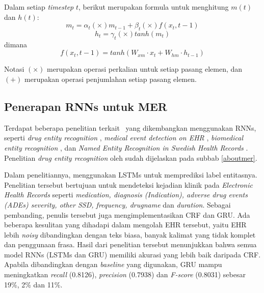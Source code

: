 Dalam setiap \textit{timestep} $ t $, berikut merupakan formula untuk menghitung $ m(t) $ dan $ h(t) $:
\begin{equation}\label{eq:mt}
m_{t}=\alpha_{t} (\times) m_{t-1} + \beta_{t} (\times) f(x_{t},{t-1})
\end{equation}
\begin{equation}\label{eq:ht}
h_{t}=\gamma_{t} (\times) tanh(m_{t})
\end{equation}
dimana
\begin{equation}\label{eq:hf}
f(x_{t},{t-1})=tanh(W_{xm} \cdot x_{t} + W_{hm} \cdot h_{t-1})
\end{equation}

Notasi $ (\times) $ merupakan operasi perkalian untuk setiap pasang elemen, dan $ (+) $ merupakan operasi penjumlahan setiap pasang elemen.

\subsection{Penerapan RNNs untuk MER}
Terdapat beberapa penelitian terkait \mer~yang dikembangkan menggunakan RNNs, seperti \textit{drug entity recognition} \citep{mujiono2016new}, \textit{medical event detection on EHR} \citep{jagannatha2016bidirectional}, \textit{biomedical entity recognition} \citep{limsopatham2016learning}, dan \textit{Named Entity Recognition in Swedish Health Records} \citep{almgren2016named}. Penelitian \textit{drug entity recognition} oleh \cite{mujiono2016new} sudah dijelaskan pada subbab \ref{aboutmer}.

Dalam penelitiannya, \cite{jagannatha2016bidirectional} menggunakan LSTMs untuk memprediksi label entitasnya. Penelitian tersebut bertujuan untuk mendeteksi kejadian klinik pada \textit{Electronic Health Records} seperti \textit{ medication, diagnosis (Indication), adverse drug events (ADEs) severity, other SSD, frequency, drugname} dan \textit{duration}. Sebagai pembanding, penulis tersebut juga mengimplementasikan CRF dan GRU. Ada beberapa kesulitan yang dihadapi dalam mengolah EHR tersebut, yaitu EHR lebih \textit{noisy} dibandingkan dengan teks biasa, banyak kalimat yang tidak komplet dan penggunaan frasa. Hasil dari penelitian tersebut menunjukkan bahwa semua model RNNs (LSTMs dan GRU) memiliki akurasi yang lebih baik daripada CRF. Apabila dibandingkan dengan \textit{baseline} yang digunakan, GRU mampu meningkatkan \textit{recall} (0.8126), \textit{precision} (0.7938) dan \textit{F-score} (0.8031) sebesar 19\%, 2\% dan 11\%.

